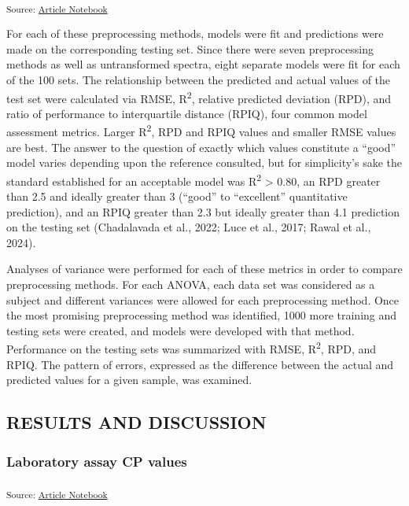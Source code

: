 \documentclass[
]{agujournal2019}
\begin{document}
\textsubscript{Source:
\href{https://rvcrawford.github.io/glowing-system/index.qmd.html}{Article
Notebook}}

For each of these preprocessing methods, models were fit and predictions
were made on the corresponding testing set. Since there were seven
preprocessing methods as well as untransformed spectra, eight separate
models were fit for each of the 100 sets. The relationship between the
predicted and actual values of the test set were calculated via RMSE,
R\textsuperscript{2}, relative predicted deviation (RPD), and ratio of
performance to interquartile distance (RPIQ), four common model
assessment metrics. Larger R\textsuperscript{2}, RPD and RPIQ values and
smaller RMSE values are best. The answer to the question of exactly
which values constitute a ``good'' model varies depending upon the
reference consulted, but for simplicity's sake the standard established
for an acceptable model was R\textsuperscript{2} \textgreater{} 0.80, an
RPD greater than 2.5 and ideally greater than 3 (``good'' to
``excellent'' quantitative prediction), and an RPIQ greater than 2.3 but
ideally greater than 4.1 prediction on the testing set (Chadalavada et
al., 2022; Luce et al., 2017; Rawal et al., 2024).

Analyses of variance were performed for each of these metrics in order
to compare preprocessing methods. For each ANOVA, each data set was
considered as a subject and different variances were allowed for each
preprocessing method. Once the most promising preprocessing method was
identified, 1000 more training and testing sets were created, and models
were developed with that method. Performance on the testing sets was
summarized with RMSE, R\textsuperscript{2}, RPD, and RPIQ. The pattern
of errors, expressed as the difference between the actual and predicted
values for a given sample, was examined.

\subsection{RESULTS AND DISCUSSION}\label{results-and-discussion}

\subsubsection{Laboratory assay CP
values}\label{laboratory-assay-cp-values}

\textsubscript{Source:
\href{https://rvcrawford.github.io/glowing-system/index.qmd.html}{Article
Notebook}}
\end{document}
